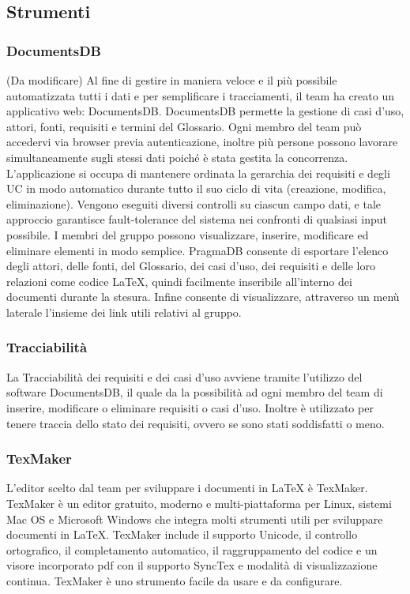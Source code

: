 \subsection{Strumenti}

\subsubsection{DocumentsDB}(Da modificare)
Al fine di gestire in maniera veloce e il più possibile automatizzata tutti i dati e per semplificare i tracciamenti, il team ha creato un applicativo web: DocumentsDB.
DocumentsDB permette la gestione di casi d’uso, attori, fonti, requisiti e termini del Glossario. Ogni membro del team può accedervi via browser previa autenticazione, inoltre più persone possono lavorare simultaneamente sugli stessi dati poiché è stata gestita la concorrenza. L’applicazione si occupa di mantenere ordinata la gerarchia dei requisiti e degli UC in modo automatico durante tutto il suo ciclo di vita (creazione, modifica, eliminazione).
Vengono eseguiti diversi controlli su ciascun campo dati, e tale approccio garantisce fault-tolerance del sistema nei confronti di qualsiasi input possibile. I membri del gruppo possono visualizzare, inserire, modificare ed eliminare elementi in modo semplice. PragmaDB consente di esportare l’elenco degli attori, delle fonti, del Glossario, dei casi d’uso, dei requisiti e delle loro relazioni come codice \LaTeX{}, quindi facilmente inseribile all’interno dei documenti durante la stesura. Infine consente di visualizzare,
attraverso un menù laterale l’insieme dei link utili relativi al gruppo.

\subsubsection{Tracciabilità}
La Tracciabilità dei requisiti e dei casi d'uso avviene tramite l'utilizzo del software DocumentsDB, il quale da la possibilità ad ogni membro del team di inserire, modificare o eliminare requisiti o casi d'uso. Inoltre è utilizzato per tenere traccia dello stato dei requisiti, ovvero se sono stati soddisfatti o meno.

\subsubsection{TexMaker}
L'editor scelto dal team per sviluppare i documenti in \LaTeX{} è TexMaker.  
TexMaker è un editor gratuito, moderno e multi-piattaforma per Linux, sistemi Mac OS e Microsoft Windows che integra molti strumenti utili per sviluppare documenti in \LaTeX{}.
TexMaker include il supporto Unicode, il controllo ortografico, il completamento automatico, il raggruppamento del codice e un visore incorporato pdf con il supporto SyncTex e modalità di visualizzazione continua.
TexMaker è uno strumento facile da usare e da configurare.


